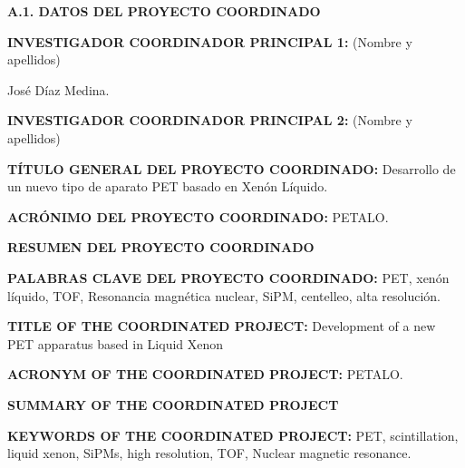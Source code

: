 \documentclass[a4paper,11pt,oneside]{article}
\begin{document}

\noindent\textbf{A.1. DATOS DEL PROYECTO COORDINADO}
\vspace{6pt}

\noindent\textbf{INVESTIGADOR COORDINADOR PRINCIPAL 1:} (Nombre y apellidos)

\noindent José Díaz Medina.
\vspace{6pt}

\noindent\textbf{INVESTIGADOR COORDINADOR PRINCIPAL 2:} (Nombre y apellidos)

\noindent 
\vspace{6pt}

\noindent\textbf{TÍTULO GENERAL DEL PROYECTO COORDINADO:} Desarrollo de un nuevo tipo de aparato PET basado en Xenón Líquido.
\vspace{6pt}

\noindent\textbf{ACRÓNIMO DEL PROYECTO COORDINADO:} PETALO.


\noindent\textbf{RESUMEN DEL PROYECTO COORDINADO} 
{\color{blue}{M\'aximo 3500 caracteres (incluyendo espacios en blanco):}}
\vspace{12pt}


 
\vspace{12pt}

\noindent\textbf{PALABRAS CLAVE DEL PROYECTO COORDINADO:} PET, xenón líquido, TOF, Resonancia magnética nuclear, SiPM, centelleo, alta resolución.

\vspace{12pt}

\noindent\textbf{TITLE OF THE COORDINATED PROJECT:} Development of a new PET apparatus based in Liquid Xenon 
\vspace{6pt}

\noindent\textbf{ACRONYM OF THE COORDINATED PROJECT:} PETALO.
\vspace{6pt}

\noindent\textbf{SUMMARY OF THE COORDINATED PROJECT} 
\vspace{6pt}



 \vspace{12pt}

\noindent\textbf{KEYWORDS OF THE COORDINATED PROJECT:} PET, scintillation, liquid xenon, SiPMs, high resolution, TOF, Nuclear magnetic resonance.  
\end{document}
